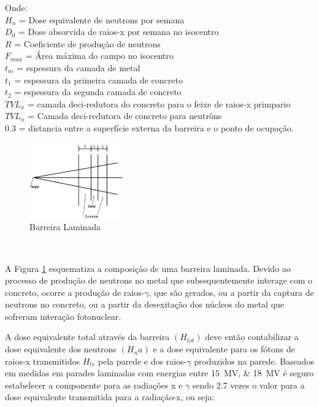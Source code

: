 \documentclass[11pt,a4paper]{article}
\begin{document}
            Onde: \\
            $H_n$ =  Dose equivalente de neutrons por semana \\
            $D_0$ =  Dose absorvida de raios-x por semana no isocentro \\
            $R$ = Coeficiente de produção de neutrons \\
            $F_{max}$ = Área máxima do campo no isocentro \\
            $t_m$ = espessura da camada de metal \\
            $t_1$ = espessura da primeira camada de concreto \\
            $t_2$ = espessura da segunda camada de concreto \\
            $TVL_x$ = camada deci-redutora do concreto para o feixe de raios-x primpario \\
            $TVL_n$ = Camada deci-redutora de concreto para neutrôns \\
            $0.3$ = distancia entre a superfície externa da barreira e o ponto de ocupação.


            \begin{figure}
                \centering
                \includegraphics[width=0.36\textwidth]{Imagens/esquemaBarreiraLaminada.JPG}
                \caption{Barreira Laminada}
                \label{fig:esquemaBarreiraLaminada}
            \end{figure}
            
            \

            A Figura \ref{fig:esquemaBarreiraLaminada} esquematiza a composição de uma barreira laminada. Devido ao processo de produção de neutrons no metal que subsequentemente interage com o concreto, ocorre a produção de raios-$\gamma$, que são gerados, ou a partir da captura de neutrons no concreto, ou a partir da desexitação dos núcleos do metal que sofreram interação fotonuclear.

            A dose equivalente total através da barreira $(H_{tot})$ deve então contabilizar a dose equivalente dos neutrons $(H_na)$ e a dose equivalente para os fótons de raios-x transmitidos $ H_{tr}$ pela parede e dos raios-$\gamma$ produzidos na parede. Baseados em medidas em parades laminadas com energias entre \qtylist{15; 18}{MV} é seguro estabelecer a componente para as radiações x e $\gamma$ sendo 2.7 vezes o valor para a dose equivalente transmitida para a radiação-x, ou seja:
\end{document}
